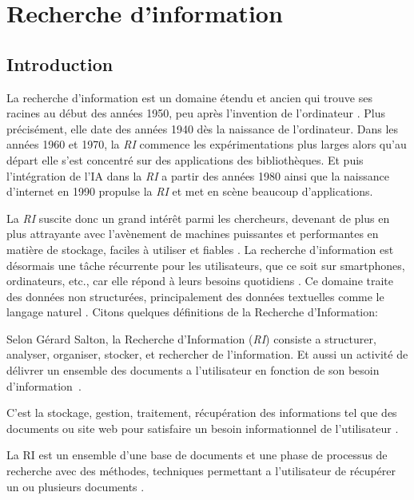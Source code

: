 \chapter{Recherche d'information}
\section{Introduction}
La recherche d'information est un domaine étendu et ancien qui trouve ses racines au début des années 1950, peu après l'invention de l'ordinateur \citep{approche-semantique}. Plus précisément, elle date des années 1940 dès la naissance de l'ordinateur. Dans les années 1960 et 1970, la \emph{RI} commence les expérimentations plus larges alors qu'au départ elle s'est concentré sur des applications des bibliothèques. Et puis l'intégration de l'IA dans la \emph{RI} a partir des années 1980 ainsi que la naissance d'internet en 1990 propulse la \emph{RI} et met en scène beaucoup d'applications. \citep{salton1989automatique}

La \emph{RI} suscite donc un grand intérêt parmi les chercheurs, devenant de plus en plus attrayante avec l'avènement de machines puissantes et performantes en matière de stockage, faciles à utiliser et fiables \citep{evaluation-of-ir-system}. La recherche d'information est désormais une tâche récurrente pour les utilisateurs, que ce soit sur smartphones, ordinateurs, etc., car elle répond à leurs besoins quotidiens \citep{thesaurus-ir-web}. Ce domaine traite des données non structurées, principalement des données textuelles comme le langage naturel \citep{modern-ir}.
Citons quelques définitions de la Recherche d'Information:

\begin{definition}
    Selon Gérard Salton, la Recherche d'Information (\emph{RI}) consiste a structurer, analyser, organiser, stocker, et rechercher de l'information. Et aussi un activité de délivrer un ensemble des documents a l'utilisateur en fonction de son besoin d'information~\cite{thesaurus-ir-web}.
\end{definition}

\begin{definition}
    C'est la stockage, gestion, traitement, récupération des informations tel que des documents ou site web pour satisfaire un besoin informationnel de l'utilisateur \citep{vsm-for-arabic-language}.
\end{definition}

\begin{definition}
    La RI est un ensemble d'une base de documents et une phase de processus de recherche avec des méthodes, techniques permettant a l'utilisateur de récupérer un ou plusieurs documents \citep{ri-sur-le-web}.
\end{definition}

